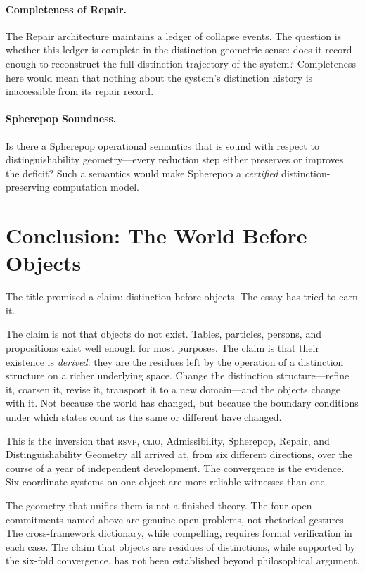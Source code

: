 \documentclass[12pt, letterpaper]{article}
\theoremstyle{remark}
\newcommand{\rsvp}{\textsc{rsvp}}
\newcommand{\clio}{\textsc{clio}}
\begin{document}
\paragraph{Completeness of Repair.}
The Repair architecture maintains a ledger of collapse events.  The
question is whether this ledger is complete in the distinction-geometric
sense: does it record enough to reconstruct the full distinction trajectory
of the system?  Completeness here would mean that nothing about the
system's distinction history is inaccessible from its repair record.

\paragraph{Spherepop Soundness.}
Is there a Spherepop operational semantics that is sound with respect to
distinguishability geometry---every reduction step either preserves or
improves the deficit?  Such a semantics would make Spherepop a
\emph{certified} distinction-preserving computation model.

\section{Conclusion: The World Before Objects}

The title promised a claim: distinction before objects.  The essay has
tried to earn it.

The claim is not that objects do not exist.  Tables, particles, persons,
and propositions exist well enough for most purposes.  The claim is that
their existence is \emph{derived}: they are the residues left by the
operation of a distinction structure on a richer underlying space.  Change
the distinction structure---refine it, coarsen it, revise it, transport it
to a new domain---and the objects change with it.  Not because the world
has changed, but because the boundary conditions under which states count
as the same or different have changed.

This is the inversion that \rsvp{}, \clio{}, Admissibility, Spherepop,
Repair, and Distinguishability Geometry all arrived at, from six different
directions, over the course of a year of independent development.  The
convergence is the evidence.  Six coordinate systems on one object are
more reliable witnesses than one.

The geometry that unifies them is not a finished theory.  The four open
commitments named above are genuine open problems, not rhetorical gestures.
The cross-framework dictionary, while compelling, requires formal
verification in each case.  The claim that objects are residues of
distinctions, while supported by the six-fold convergence, has not been
established beyond philosophical argument.
\end{document}
